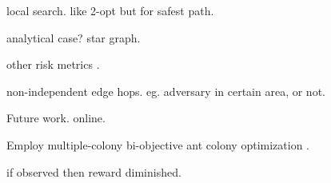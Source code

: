 \documentclass[11pt, oneside]{article}
\begin{document}
local search. like 2-opt but for safest path.

analytical case? star graph.

other risk metrics \cite{majumdar2020should}.

non-independent edge hops. eg. adversary in certain area, or not.

Future work. online.

Employ multiple-colony bi-objective ant colony optimization \cite{iredi2001bi}.

if observed then reward diminished.




\end{document}
